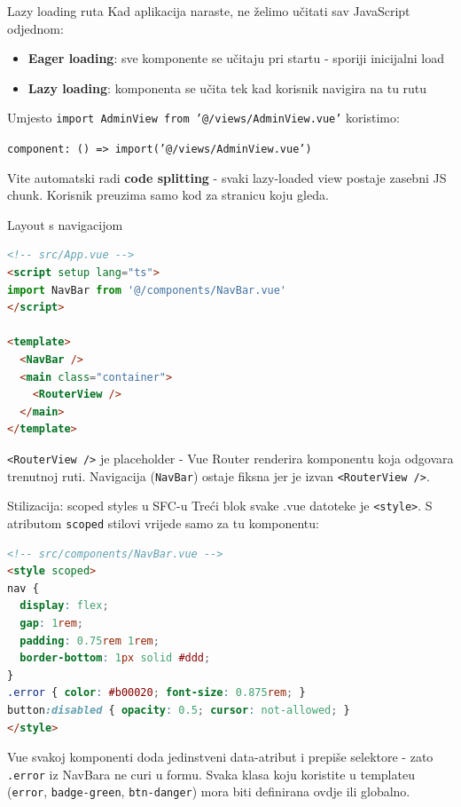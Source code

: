 \begin{frame}{Lazy loading ruta}
Kad aplikacija naraste, ne želimo učitati sav JavaScript odjednom:

\vspace{0.4em}
\begin{itemize}
  \item \textbf{Eager loading}: sve komponente se učitaju pri startu - sporiji inicijalni load
  \item \textbf{Lazy loading}: komponenta se učita tek kad korisnik navigira na tu rutu
\end{itemize}

\vspace{0.6em}
Umjesto \texttt{import AdminView from '@/views/AdminView.vue'} koristimo:

\vspace{0.2em}
\texttt{component: () => import('@/views/AdminView.vue')}

\vspace{0.6em}
Vite automatski radi \textbf{code splitting} - svaki lazy-loaded view postaje zasebni JS chunk. Korisnik preuzima samo kod za stranicu koju gleda.
\end{frame}

\begin{frame}[fragile,shrink=5]{Layout s navigacijom}
\begin{lstlisting}[language=html]
<!-- src/App.vue -->
<script setup lang="ts">
import NavBar from '@/components/NavBar.vue'
</script>

<template>
  <NavBar />
  <main class="container">
    <RouterView />
  </main>
</template>
\end{lstlisting}

\vspace{0.4em}
\texttt{<RouterView />} je placeholder - Vue Router renderira komponentu koja odgovara trenutnoj ruti. Navigacija (\texttt{NavBar}) ostaje fiksna jer je izvan \texttt{<RouterView />}.
\end{frame}

\begin{frame}[fragile,shrink=5]{Stilizacija: scoped styles u SFC-u}
Treći blok svake .vue datoteke je \texttt{<style>}. S atributom \texttt{scoped} stilovi vrijede samo za tu komponentu:

\begin{lstlisting}[language=html]
<!-- src/components/NavBar.vue -->
<style scoped>
nav {
  display: flex;
  gap: 1rem;
  padding: 0.75rem 1rem;
  border-bottom: 1px solid #ddd;
}
.error { color: #b00020; font-size: 0.875rem; }
button:disabled { opacity: 0.5; cursor: not-allowed; }
</style>
\end{lstlisting}

\vspace{0.4em}
Vue svakoj komponenti doda jedinstveni data-atribut i prepiše selektore - zato \texttt{.error} iz NavBara ne curi u formu. Svaka klasa koju koristite u templateu (\texttt{error}, \texttt{badge-green}, \texttt{btn-danger}) mora biti definirana ovdje ili globalno.
\end{frame}

